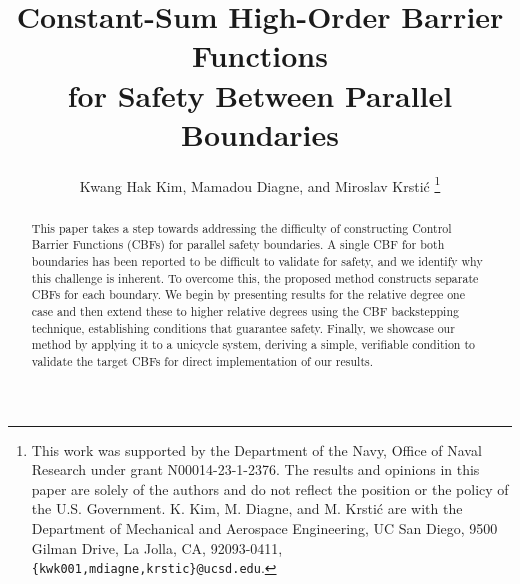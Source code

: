 \documentclass[letterpaper, 10 pt, conference]{ieeeconf}
\begin{document}
\title{Constant-Sum High-Order Barrier Functions\\
for Safety Between Parallel Boundaries}

\author{Kwang Hak Kim, Mamadou Diagne, and Miroslav Krstić%
\thanks{This work was supported by the Department of the Navy, Office of Naval Research under grant N00014-23-1-2376. The results and opinions in this paper are solely of the authors and do not reflect the position or the policy of the U.S. Government.\endgraf
K. Kim, M. Diagne, and M. Krstić are with the Department of Mechanical and Aerospace Engineering, UC San Diego, 9500 Gilman Drive, La Jolla, CA, 92093-0411, {\tt\small \{kwk001,mdiagne,krstic\}@ucsd.edu}.}
}

\maketitle
\begin{abstract}
This paper takes a step towards addressing the difficulty of constructing Control Barrier Functions (CBFs) for parallel safety boundaries. A single CBF for both boundaries has been reported to be difficult to validate for safety, and we identify why this challenge is inherent. To overcome this, the proposed method constructs separate CBFs for each boundary. We begin by presenting results for the relative degree one case and then extend these to higher relative degrees using the CBF backstepping technique, establishing conditions that guarantee safety. Finally, we showcase our method by applying it to a unicycle system, deriving a simple, verifiable condition to validate the target CBFs for direct implementation of our results.
\end{abstract}


\end{document}

